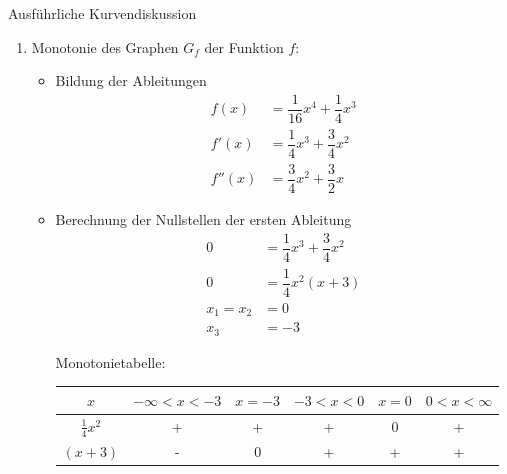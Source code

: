 \begin{bsp}{Ausführliche Kurvendiskussion}{}
\begin{enumerate}
\begin{itemize}
    \item Schnittpunkte mit der x-Achse
    \begin{equation*}
        \begin{split}
         0 &= \dfrac{1}{16} x^3 (x+4)\\
             x_1 =x_2=x_3&= 0 \longrightarrow SP_{x_1} = SP_{x_2} = SP_{x_3}(0|0) \\
             x_4&= -4 \longrightarrow SP_{x_4}(-4|0)
        \end{split}
\end{equation*}
    \end{itemize}
  \item Monotonie des Graphen $G_f$ der Funktion $f$:  
    \begin{itemize}
        \item Bildung der Ableitungen
    \begin{equation*}
        \begin{split}
        f(x) &= \dfrac{1}{16} x^4 +\dfrac{1}{4} x^3\\
            f'(x)&= \dfrac{1}{4} x^3 +\dfrac{3}{4} x^2\\
            f''(x) &= \dfrac{3}{4} x^2 + \dfrac{3}{2} x
        \end{split}
\end{equation*}
       \item Berechnung der Nullstellen der ersten Ableitung 
           \begin{equation*}
        \begin{split}
         0 &= \dfrac{1}{4} x^3 +\dfrac{3}{4} x^2\\
         0 &= \dfrac{1}{4} x^2 (x+3)\\
         x_1 =x_2 &= 0\\
         x_3&= -3
        \end{split}
\end{equation*}

Monotonietabelle:
\begin{center}\begin{tabular}{||c|c|c|c|c|c||}
    \hline
    $x$& $ -\infty <x<-3 $ & $ x = -3$ &$ -3<x<0 $ & $x=0 $& $ 0<x<\infty $\\
    \hline \hline
    $\frac{1}{4} x^2$ & + &  + & + & 0 & +  \\
    \hline
    $(x +3)$ & - & 0 & + & + & + \\
    \hline


\end{tabular}
\end{center}
\end{itemize}
\end{enumerate}
\end{bsp}
